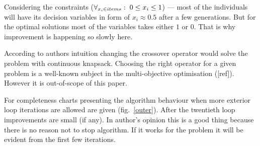 Considering the constraints ($ \forall_{x_i \in items}: \hspace{0.1cm} 0 \leq
x_i \leq 1 $) --- most of the individuals will have its decision variables in
form of $x_i \approx 0.5$ after a few generations. But for the optimal
solutions most of the variables takes either $1$ or $0$. That is why
improvement is happening so slowly here.

According to authors intuition changing the crossover operator would solve the
problem with continuous knapsack. Choosing the right operator for a given
problem is a well-known subject in the multi-objective optimisation
([ref]). However it is out-of-scope of this paper.

For completeness charts presenting the algorithm behaviour when more exterior
loop iterations are allowed are given (fig.~\ref{outer}). After the twentieth
loop improvements are small (if any). In author's opinion this is a good thing
because there is no reason not to stop algorithm. If it works for the problem
it will be evident from the first few iterations.

